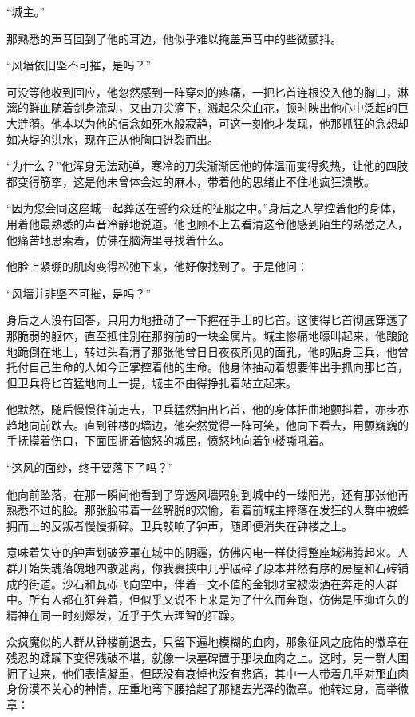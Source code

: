 “城主。”

那熟悉的声音回到了他的耳边，他似乎难以掩盖声音中的些微颤抖。

“风墙依旧坚不可摧，是吗？”

可没等他收到回应，他忽然感到一阵穿刺的疼痛，一把匕首连根没入他的胸口，淋漓的鲜血随着剑身流动，又由刀尖滴下，溅起朵朵血花，顿时映出他心中泛起的巨大涟漪。他本以为他的信念如死水般寂静，可这一刻他才发现，他那抓狂的念想却如决堤的洪水，现在正从他胸口迸裂而出。

“为什么？”他浑身无法动弹，寒冷的刀尖渐渐因他的体温而变得炙热，让他的四肢都变得筋挛，这是他未曾体会过的麻木，带着他的思绪止不住地疯狂溃散。

“因为您会同这座城一起葬送在誓约众廷的征服之中。”身后之人掌控着他的身体，用着他最熟悉的声音冷静地说道。他也顾不上去看清这令他感到陌生的熟悉之人，他痛苦地思索着，仿佛在脑海里寻找着什么。

他脸上紧绷的肌肉变得松弛下来，他好像找到了。于是他问：

“风墙并非坚不可摧，是吗？”

身后之人没有回答，只用力地扭动了一下握在手上的匕首。这使得匕首彻底穿透了那脆弱的躯体，直至抵住別在那胸前的一块金属片。城主惨痛地嚎叫起来，他踉跄地跪倒在地上，转过头看清了那张他曾日日夜夜所见的面孔，他的贴身卫兵，他曾托付自己生命的人如今正掌控着他的生命。他身体抽动着想要伸出手抓向那匕首，但卫兵将匕首猛地向上一提，城主不由得挣扎着站立起来。

他默然，随后慢慢往前走去，卫兵猛然抽出匕首，他的身体扭曲地颤抖着，亦步亦趋地向前跌去。直到钟楼的墙边，他突然觉得一阵可笑，他向下看去，用颤巍巍的手抚摸着伤口，下面围拥着恼怒的城民，愤怒地向着钟楼嘶吼着。

“这风的面纱，终于要落下了吗？”

他向前坠落，在那一瞬间他看到了穿透风墙照射到城中的一缕阳光，还有那张他再熟悉不过的脸。那张脸带着一丝解脱的欢愉，看着前城主摔落在发狂的人群中被蜂拥而上的反叛者慢慢撕碎。卫兵敲响了钟声，随即便消失在钟楼之上。

意味着失守的钟声划破笼罩在城中的阴霾，仿佛闪电一样使得整座城沸腾起来。人群开始失魂落魄地四散逃离，你我裹挟中几乎碾碎了原本井然有序的房屋和石砖铺成的街道。沙石和瓦砾飞向空中，伴着一文不值的金银财宝被泼洒在奔走的人群中。所有人都在狂奔着，但似乎又说不上来是为了什么而奔跑，仿佛是压抑许久的精神在同一时刻爆发，近乎于失去理智的狂躁。

众疯魔似的人群从钟楼前退去，只留下遍地模糊的血肉，那象征风之庇佑的徽章在残忍的蹂躏下变得残破不堪，就像一块墓碑置于那块血肉之上。这时，另一群人围拥了过来，他们表情凝重，但既没有哀悼也没有悲痛，其中一人带着几乎对那血肉身份漠不关心的神情，庄重地弯下腰拾起了那褪去光泽的徽章。他转过身，高举徽章：

